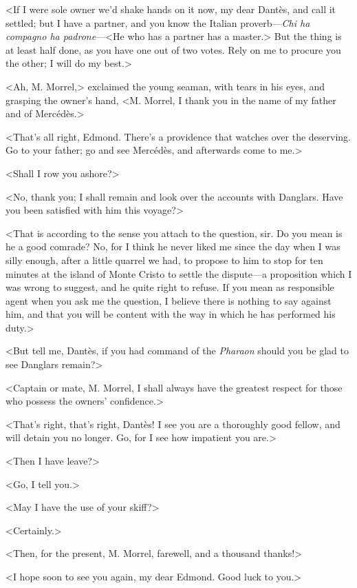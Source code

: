  <If I were sole owner we'd shake hands on it now, my dear Dantès, and call it settled; but I have a partner, and you know the Italian proverb—\textit{Chi ha compagno ha padrone}—<He who has a partner has a master.> But the thing is at least half done, as you have one out of two votes. Rely on me to procure you the other; I will do my best.> 

 <Ah, M. Morrel,> exclaimed the young seaman, with tears in his eyes, and grasping the owner's hand, <M. Morrel, I thank you in the name of my father and of Mercédès.> 

 <That's all right, Edmond. There's a providence that watches over the deserving. Go to your father; go and see Mercédès, and afterwards come to me.> 

 <Shall I row you ashore?> 

 <No, thank you; I shall remain and look over the accounts with Danglars. Have you been satisfied with him this voyage?> 

 <That is according to the sense you attach to the question, sir. Do you mean is he a good comrade? No, for I think he never liked me since the day when I was silly enough, after a little quarrel we had, to propose to him to stop for ten minutes at the island of Monte Cristo to settle the dispute—a proposition which I was wrong to suggest, and he quite right to refuse. If you mean as responsible agent when you ask me the question, I believe there is nothing to say against him, and that you will be content with the way in which he has performed his duty.> 

 <But tell me, Dantès, if you had command of the \textit{Pharaon} should you be glad to see Danglars remain?> 

 <Captain or mate, M. Morrel, I shall always have the greatest respect for those who possess the owners' confidence.> 

 <That's right, that's right, Dantès! I see you are a thoroughly good fellow, and will detain you no longer. Go, for I see how impatient you are.> 

 <Then I have leave?> 

 <Go, I tell you.> 

 <May I have the use of your skiff?> 

 <Certainly.> 

 <Then, for the present, M. Morrel, farewell, and a thousand thanks!> 

 <I hope soon to see you again, my dear Edmond. Good luck to you.> 

